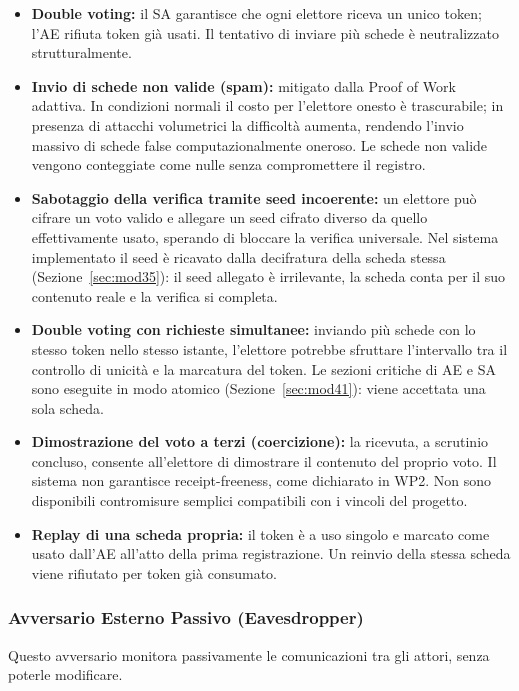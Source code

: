 \documentclass[12pt,a4paper]{article}
\begin{document}
\begin{itemize}
  \item \textbf{Double voting:} il SA garantisce che ogni elettore riceva un unico token; l'AE rifiuta token già usati. Il tentativo di inviare più schede è neutralizzato strutturalmente.
  \item \textbf{Invio di schede non valide (spam):} mitigato dalla Proof of Work adattiva. In condizioni normali il costo per l'elettore onesto è trascurabile; in presenza di attacchi volumetrici la difficoltà aumenta, rendendo l'invio massivo di schede false computazionalmente oneroso. Le schede non valide vengono conteggiate come nulle senza compromettere il registro.
  \item \textbf{Sabotaggio della verifica tramite seed incoerente:} un elettore può cifrare un voto valido e allegare un seed cifrato diverso da quello effettivamente usato, sperando di bloccare la verifica universale. Nel sistema implementato il seed è ricavato dalla decifratura della scheda stessa (Sezione~\ref{sec:mod35}): il seed allegato è irrilevante, la scheda conta per il suo contenuto reale e la verifica si completa.
  \item \textbf{Double voting con richieste simultanee:} inviando più schede con lo stesso token nello stesso istante, l'elettore potrebbe sfruttare l'intervallo tra il controllo di unicità e la marcatura del token. Le sezioni critiche di AE e SA sono eseguite in modo atomico (Sezione~\ref{sec:mod41}): viene accettata una sola scheda.
  \item \textbf{Dimostrazione del voto a terzi (coercizione):} la ricevuta, a scrutinio concluso, consente all'elettore di dimostrare il contenuto del proprio voto. Il sistema non garantisce receipt-freeness, come dichiarato in WP2. Non sono disponibili contromisure semplici compatibili con i vincoli del progetto.
  \item \textbf{Replay di una scheda propria:} il token è a uso singolo e marcato come usato dall'AE all'atto della prima registrazione. Un reinvio della stessa scheda viene rifiutato per token già consumato.
\end{itemize}

\subsubsection{Avversario Esterno Passivo (Eavesdropper)}

Questo avversario monitora passivamente le comunicazioni tra gli attori, senza poterle modificare.
\end{document}
